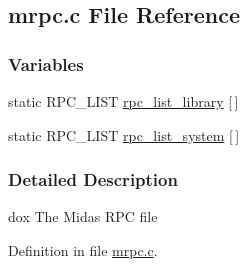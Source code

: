 \subsection{mrpc.c File Reference}
\label{mrpc_8c}
\subsubsection*{Variables}
\begin{DoxyCompactItemize}
\item 
static RPC\_\-LIST \hyperlink{group__mrpcstructc_gac70e10137f9db5797fd787c326ade74a}{rpc\_\-list\_\-library} \mbox{[}$\,$\mbox{]}
\item 
static RPC\_\-LIST \hyperlink{group__mrpcstructc_ga3aedfec709ee3e22f1f9040dde0bd75b}{rpc\_\-list\_\-system} \mbox{[}$\,$\mbox{]}
\end{DoxyCompactItemize}


\subsubsection{Detailed Description}
dox The Midas RPC file 

Definition in file \hyperlink{mrpc_8c_source}{mrpc.c}.